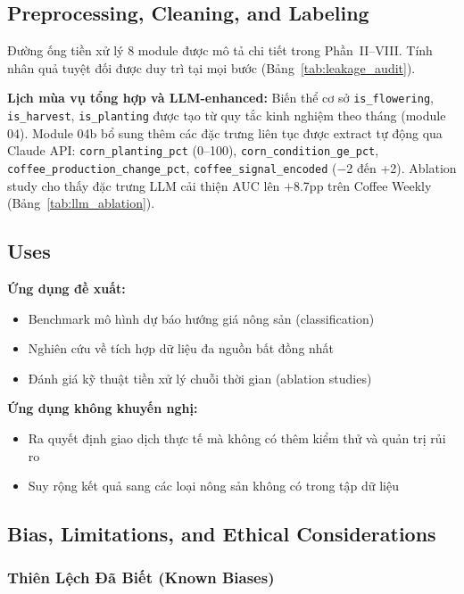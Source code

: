 \subsection{Preprocessing, Cleaning, and Labeling}

Đường ống tiền xử lý 8 module được mô tả chi tiết trong Phần~II--VIII.
Tính nhân quả tuyệt đối được duy trì tại mọi bước (Bảng~\ref{tab:leakage_audit}).

\textbf{Lịch mùa vụ tổng hợp và LLM-enhanced:}
Biến thể cơ sở \texttt{is\_flowering}, \texttt{is\_harvest}, \texttt{is\_planting}
được tạo từ quy tắc kinh nghiệm theo tháng (module 04).
Module 04b bổ sung thêm các đặc trưng liên tục được extract tự động qua Claude API:
\texttt{corn\_planting\_pct} (0–100), \texttt{corn\_condition\_ge\_pct},
\texttt{coffee\_production\_change\_pct}, \texttt{coffee\_signal\_encoded} (−2 đến +2).
Ablation study cho thấy đặc trưng LLM cải thiện AUC lên $+$8.7pp trên Coffee Weekly
(Bảng~\ref{tab:llm_ablation}).

\subsection{Uses}

\textbf{Ứng dụng đề xuất:}
\begin{itemize}
\item Benchmark mô hình dự báo hướng giá nông sản (classification)
\item Nghiên cứu về tích hợp dữ liệu đa nguồn bất đồng nhất
\item Đánh giá kỹ thuật tiền xử lý chuỗi thời gian (ablation studies)
\end{itemize}

\textbf{Ứng dụng không khuyến nghị:}
\begin{itemize}
\item Ra quyết định giao dịch thực tế mà không có thêm kiểm thử và quản trị rủi ro
\item Suy rộng kết quả sang các loại nông sản không có trong tập dữ liệu
\end{itemize}

\subsection{Bias, Limitations, and Ethical Considerations}

\subsubsection{Thiên Lệch Đã Biết (Known Biases)}


